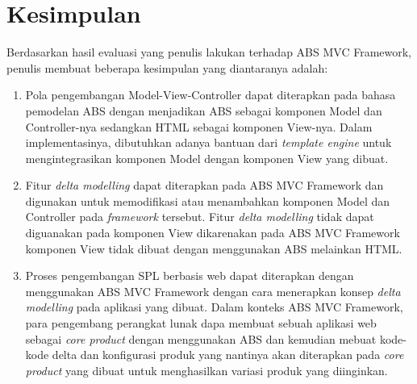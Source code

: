 \chapter{Kesimpulan}

Berdasarkan hasil evaluasi yang penulis lakukan terhadap ABS MVC Framework, penulis membuat beberapa kesimpulan yang diantaranya adalah:

\begin{enumerate}
    \item Pola pengembangan Model-View-Controller dapat diterapkan pada bahasa pemodelan ABS dengan menjadikan ABS sebagai komponen Model dan Controller-nya sedangkan HTML sebagai komponen View-nya. Dalam implementasinya, dibutuhkan adanya bantuan dari \textit{template engine} untuk mengintegrasikan komponen Model dengan komponen View yang dibuat.
    \item Fitur \textit{delta modelling} dapat diterapkan pada ABS MVC Framework dan digunakan untuk memodifikasi atau menambahkan komponen Model dan Controller pada \textit{framework} tersebut. Fitur \textit{delta modelling} tidak dapat diguanakan pada komponen View dikarenakan pada ABS MVC Framework komponen View tidak dibuat dengan menggunakan ABS melainkan HTML.
    \item Proses pengembangan SPL berbasis web dapat diterapkan dengan menggunakan ABS MVC Framework dengan cara menerapkan konsep \textit{delta modelling} pada aplikasi yang dibuat. Dalam konteks ABS MVC Framework, para pengembang perangkat lunak dapa membuat sebuah aplikasi web sebagai \textit{core product} dengan menggunakan ABS dan kemudian mebuat kode-kode delta dan konfigurasi produk yang nantinya akan diterapkan pada \textit{core product} yang dibuat untuk menghasilkan variasi produk yang diinginkan.
\end{enumerate}